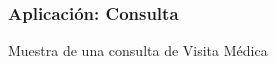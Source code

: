 \documentclass[14pt]{beamer}
\begin{document}
\begin{frame}
\frametitle{Aplicación: Consulta}
Muestra de una consulta de Visita Médica
\begin{columns}
\begin{column}{0.3\textwidth}
\begin{center}

\begin{small}
\caption{}
\end{small}
\end{center}
\end{column}


\end{columns}

\end{frame}
\end{document}
